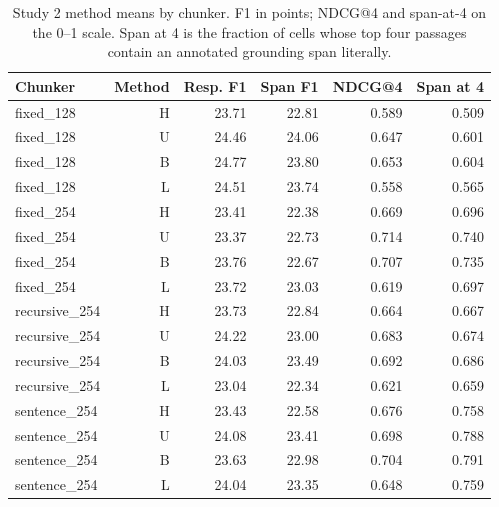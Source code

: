 \begin{table}[htbp]\centering\small
\caption{Study 2 method means by chunker. F1 in points; NDCG@4 and span-at-4 on the 0--1 scale. Span at 4 is the fraction of cells whose top four passages contain an annotated grounding span literally.}\label{tab:chunkermethods}
\begin{tabular}{lrrrrr}\toprule
Chunker & Method & Resp. F1 & Span F1 & NDCG@4 & Span at 4\\\midrule
fixed\_128 & H & 23.71 & 22.81 & 0.589 & 0.509\\
fixed\_128 & U & 24.46 & 24.06 & 0.647 & 0.601\\
fixed\_128 & B & 24.77 & 23.80 & 0.653 & 0.604\\
fixed\_128 & L & 24.51 & 23.74 & 0.558 & 0.565\\
fixed\_254 & H & 23.41 & 22.38 & 0.669 & 0.696\\
fixed\_254 & U & 23.37 & 22.73 & 0.714 & 0.740\\
fixed\_254 & B & 23.76 & 22.67 & 0.707 & 0.735\\
fixed\_254 & L & 23.72 & 23.03 & 0.619 & 0.697\\
recursive\_254 & H & 23.73 & 22.84 & 0.664 & 0.667\\
recursive\_254 & U & 24.22 & 23.00 & 0.683 & 0.674\\
recursive\_254 & B & 24.03 & 23.49 & 0.692 & 0.686\\
recursive\_254 & L & 23.04 & 22.34 & 0.621 & 0.659\\
sentence\_254 & H & 23.43 & 22.58 & 0.676 & 0.758\\
sentence\_254 & U & 24.08 & 23.41 & 0.698 & 0.788\\
sentence\_254 & B & 23.63 & 22.98 & 0.704 & 0.791\\
sentence\_254 & L & 24.04 & 23.35 & 0.648 & 0.759\\
\bottomrule\end{tabular}\end{table}
